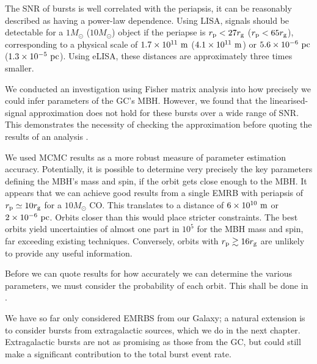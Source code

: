 The SNR of bursts is well correlated with the periapsis, it can be reasonably described as having a power-law dependence. Using LISA, signals should be detectable for a $1 M_\odot$ ($10 M_\odot$) object if the periapse is $r_\mathrm{p} < 27 r_\mathrm{g}$ ($r_\mathrm{p} < 65 r_\mathrm{g}$), corresponding to a physical scale of $1.7 \times 10^{11}~\mathrm{m}$ ($4.1 \times 10^{11}~\mathrm{m}$) or $5.6 \times 10^{-6}~\mathrm{pc}$ ($1.3 \times 10^{-5}~\mathrm{pc}$). Using eLISA, these distances are approximately three times smaller.

We conducted an investigation using Fisher matrix analysis into how precisely we could infer parameters of the GC's MBH. However, we found that the linearised-signal approximation does not hold for these bursts over a wide range of SNR. This demonstrates the necessity of checking the approximation before quoting the results of an analysis \citep{Vallisneri2008}.

We used MCMC results as a more robust measure of parameter estimation accuracy. Potentially, it is possible to determine very precisely the key parameters defining the MBH's mass and spin, if the orbit gets close enough to the MBH. It appears that we can achieve good results from a single EMRB with periapsis of $r_\mathrm{p} \simeq 10 r_\mathrm{g}$ for a $10 M_\odot$ CO. This translates to a distance of $6 \times 10^{10}~\mathrm{m}$ or $2 \times 10^{-6}~\mathrm{pc}$. Orbits closer than this would place stricter constraints. The best orbits yield uncertainties of almost one part in $10^5$ for the MBH mass and spin, far exceeding existing techniques. Conversely, orbits with $r_\mathrm{p} \gtrsim 16 r_\mathrm{g}$ are unlikely to provide any useful information.

Before we can quote results for how accurately we can determine the various parameters, we must consider the probability of each orbit. This shall be done in .

We have so far only considered EMRBS from our Galaxy; a natural extension is to consider bursts from extragalactic sources, which we do in the next chapter. Extragalactic bursts are not as promising as those from the GC, but could still make a significant contribution to the total burst event rate. 
